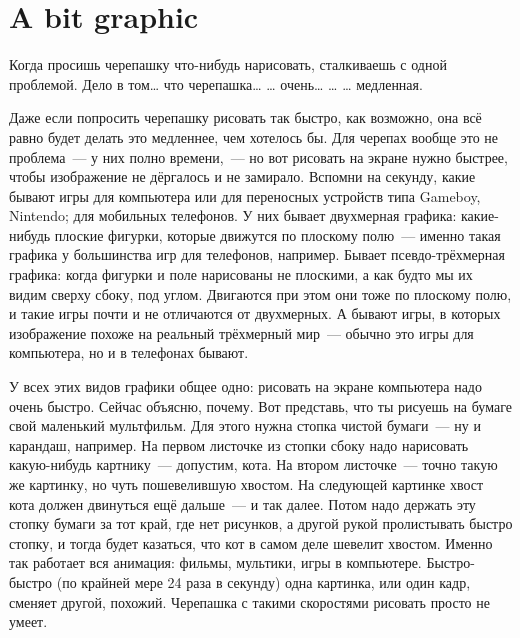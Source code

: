 %
%
%

\chapter{A bit graphic}\label{ch:abitgraphic}

Когда просишь черепашку что-нибудь нарисовать, сталкиваешь с одной проблемой. Дело в том… что черепашка… … очень… … … медленная.

Даже если попросить черепашку рисовать так быстро, как возможно, она всё равно будет делать это медленнее, чем хотелось бы. Для черепах вообще это не проблема — у них полно времени, — но вот рисовать на экране нужно быстрее, чтобы изображение не дёргалось и не замирало. Вспомни на секунду, какие бывают игры для компьютера или для переносных устройств типа Gameboy, Nintendo; для мобильных телефонов. У них бывает двухмерная графика: какие-нибудь плоские фигурки, которые движутся по плоскому полю — именно такая графика у большинства игр для телефонов, например. Бывает псевдо-трёхмерная графика: когда фигурки и поле нарисованы не плоскими, а как будто мы их видим сверху сбоку, под углом. Двигаются при этом они тоже по плоскому полю, и такие игры почти и не отличаются от двухмерных. А бывают игры, в которых изображение похоже на реальный трёхмерный мир — обычно это игры для компьютера, но и в телефонах бывают.

У всех этих видов графики общее одно: рисовать на экране компьютера надо очень быстро. Сейчас объясню, почему. Вот представь, что ты рисуешь на бумаге свой маленький мультфильм. Для этого нужна стопка чистой бумаги — ну и карандаш, например. На первом листочке из стопки сбоку надо нарисовать какую-нибудь картнику — допустим, кота. На втором листочке — точно такую же картинку, но чуть пошевелившую хвостом. На следующей картинке хвост кота должен двинуться ещё дальше — и так далее. Потом надо держать эту стопку бумаги за тот край, где нет рисунков, а другой рукой пролистывать быстро стопку, и тогда будет казаться, что кот в самом деле шевелит хвостом. Именно так работает вся анимация: фильмы, мультики, игры в компьютере. Быстро-быстро (по крайней мере 24 раза в секунду) одна картинка, или один кадр, сменяет другой, похожий. Черепашка с такими скоростями рисовать просто не умеет.

